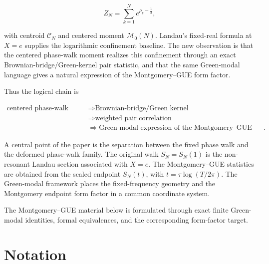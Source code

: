 \documentclass[11pt]{amsart}
\numberwithin{equation}{section}
\theoremstyle{plain}
\theoremstyle{definition}
\theoremstyle{remark}
\begin{document}
\begin{equation}
Z_N=\sum_{k=1}^{N}e^{\rho_k-\frac12},
\label{eq:introduction_complete_zero_walk}
\end{equation}

with centroid \(\mathcal C_N\) and centered moment
\(\mathcal M_0(N)\). Landau's fixed-real formula at \(X=e\) supplies the
logarithmic confinement baseline. The new observation is that the centered
phase-walk moment realizes this confinement through an exact
Brownian-bridge/Green-kernel pair statistic, and that the same
Green-modal language gives a natural expression of the Montgomery--GUE
form factor.

Thus the logical chain is

\begin{equation}
\begin{aligned}
\text{centered phase-walk geometry}
&\Longrightarrow
\text{Brownian-bridge/Green kernel}
\\
&\Longrightarrow
\text{weighted pair correlation}
\\
&\Longrightarrow
\text{Green-modal expression of the Montgomery--GUE form factor}.
\end{aligned}
\label{eq:introduction_logical_chain}
\end{equation}

A central point of the paper is the separation between the fixed phase walk and the deformed phase-walk family. The original walk \(S_N=S_N(1)\) is the non-resonant Landau section associated with \(X=e\). The Montgomery--GUE statistics are obtained from the scaled endpoint \(S_N(t)\), with \(t=\tau\log(T/2\pi)\). The Green-modal framework places the fixed-frequency geometry and the Montgomery endpoint form factor in a common coordinate system.

The Montgomery--GUE material below is formulated through exact finite
Green-modal identities, formal equivalences, and the corresponding
form-factor target.

\section*{Notation}
\label{sec:notation}
\end{document}
